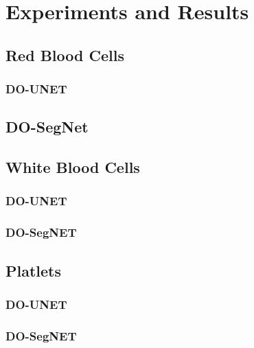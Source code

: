 \section{Experiments and Results}

\subsection{Red Blood Cells}
\subsubsection{DO-UNET}

\subsection{DO-SegNet}

\subsection{White Blood Cells}
\subsubsection{DO-UNET}
\subsubsection{DO-SegNET}


\subsection{Platlets}
\subsubsection{DO-UNET}
\subsubsection{DO-SegNET}


\subsection{}
\vspace{0.2in}
\hspace*{0.16in}